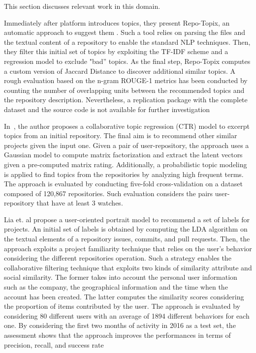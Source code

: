 This section discusses relevant work in this domain.




Immediately after \GH platform introduces topics, they present Repo-Topix, an automatic approach to suggest them \cite{ganesan_topic_2017}. Such a tool relies on parsing the \RM files and the textual content of a repository to enable the standard NLP techniques. Then, they filter this initial set of topics by exploiting the TF-IDF scheme and a regression model to exclude "bad'' topics. As the final step, Repo-Topix computes a custom version of Jaccard Distance to discover additional similar topics. A rough evaluation based on the n-gram ROUGE-1 metrics has been conducted by counting the number of overlapping units between the recommended topics and the repository description. Nevertheless, a replication package with the complete dataset and the source code is not available for further investigation

In~\cite{orii_modeling_2013}, the author proposes a collaborative topic regression (CTR) model to excerpt topics from an initial \GH repository. The final aim is to recommend other similar projects given the input one. Given a pair of user-repository, the approach uses a Gaussian model to compute matrix factorization and extract the latent vectors given a pre-computed matrix rating. Additionally, a probabilistic topic modeling is applied to find topics from the repositories by analyzing high frequent terms. The approach is evaluated by conducting five-fold cross-validation on a dataset composed of  120,867 repositories. Such evaluation considers the pairs user-repository that have at least 3 watches. 

Lia et. al \cite{liao_user_2018} propose a user-oriented portrait model to recommend a set of labels for \GH projects. An initial set of labels is obtained by computing the LDA algorithm on the textual elements of a repository \ie issues, commits, and pull requests. Then, the approach exploits a project familiarity technique that relies on the user's behavior considering the different repositories operation. Such a strategy enables the collaborative filtering technique that exploits two kinds of similarity \ie attribute and social similarity. The former takes into account the personal user information such as the company, the geographical information and the time when the account has been created. The latter computes the similarity scores considering the proportion of items contributed by the user. The approach is evaluated by considering 80 different users with an average of 1894 different behaviors for each one. By considering the first two months of activity in 2016 as a test set, the assessment shows that the approach improves the performances in terms of precision, recall, and success rate


